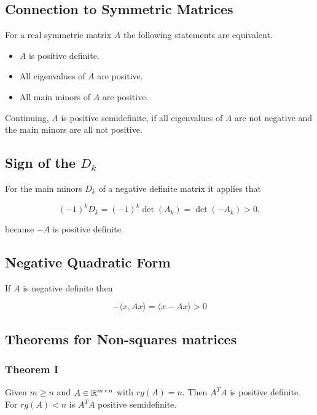 \subsection{Connection to Symmetric Matrices}

For a real symmetric matrix \(A\) the following statements are equivalent.

\begin{itemize}
    
    \item \(A\) is positive definite.

    \item All eigenvalues of \(A\) are positive.

    \item All main minors of \(A\) are positive.

\end{itemize}

Continuing, \(A\) is positive semidefinite, if all eigenvalues of \(A\) are not negative and the 
main minors are all not positive.

\subsection{Sign of the \texorpdfstring{\(D_k\)}{}}

For the main minors \(D_k\) of a negative definite matrix it applies that 

\[
    (-1)^k D_k = (-1)^k \det(A_k) = \det(-A_k) > 0,
\]

because \(-A\) is positive definite.

\subsection{Negative Quadratic Form}

If \(A\) is negative definite then 

\[
    -\langle x, Ax \rangle = \langle x -Ax \rangle > 0
\]

\subsection{Theorems for Non-squares matrices}

\subsubsection{Theorem I}

Given \(m \ge n\) and \(A \in \mathbb{R}^{m \times n}\) with \(rg(A) = n\). Then \(A^T A\) is positive 
definite. For \(rg(A) < n\) is \(A^T A\) positive semidefinite.
\vspace{\baselineskip}

